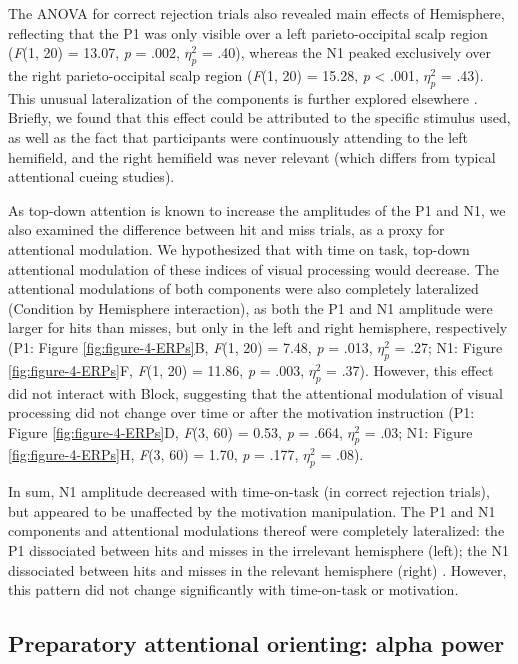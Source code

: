 \documentclass[11pt,english,]{memoir}
\begin{document}
The ANOVA for correct rejection trials also revealed main effects of Hemisphere, reflecting that the P1 was only visible over a left parieto-occipital scalp region (\emph{F}(1, 20) = 13.07, \emph{p} = .002, \(\eta^2_p\) = .40), whereas the N1 peaked exclusively over the right parieto-occipital scalp region (\emph{F}(1, 20) = 15.28, \emph{p} \textless{} .001, \(\eta^2_p\) = .43). This unusual lateralization of the components is further explored elsewhere \autocite{Slagter2016}. Briefly, we found that this effect could be attributed to the specific stimulus used, as well as the fact that participants were continuously attending to the left hemifield, and the right hemifield was never relevant (which differs from typical attentional cueing studies).

As top-down attention is known to increase the amplitudes of the P1 and N1, we also examined the difference between hit and miss trials, as a proxy for attentional modulation. We hypothesized that with time on task, top-down attentional modulation of these indices of visual processing would decrease. The attentional modulations of both components were also completely lateralized (Condition by Hemisphere interaction), as both the P1 and N1 amplitude were larger for hits than misses, but only in the left and right hemisphere, respectively (P1: Figure \ref{fig:figure-4-ERPs}B, \emph{F}(1, 20) = 7.48, \emph{p} = .013, \(\eta^2_p\) = .27; N1: Figure \ref{fig:figure-4-ERPs}F, \emph{F}(1, 20) = 11.86, \emph{p} = .003, \(\eta^2_p\) = .37). However, this effect did not interact with Block, suggesting that the attentional modulation of visual processing did not change over time or after the motivation instruction (P1: Figure \ref{fig:figure-4-ERPs}D, \emph{F}(3, 60) = 0.53, \emph{p} = .664, \(\eta^2_p\) = .03; N1: Figure \ref{fig:figure-4-ERPs}H, \emph{F}(3, 60) = 1.70, \emph{p} = .177, \(\eta^2_p\) = .08).

In sum, N1 amplitude decreased with time-on-task (in correct rejection trials), but appeared to be unaffected by the motivation manipulation. The P1 and N1 components and attentional modulations thereof were completely lateralized: the P1 dissociated between hits and misses in the irrelevant hemisphere (left); the N1 dissociated between hits and misses in the relevant hemisphere (right) \autocite[see][]{Slagter2016}. However, this pattern did not change significantly with time-on-task or motivation.

\hypertarget{preparatory-attentional-orienting-alpha-power}{%
\subsection{Preparatory attentional orienting: alpha power}\label{preparatory-attentional-orienting-alpha-power}}
\end{document}
